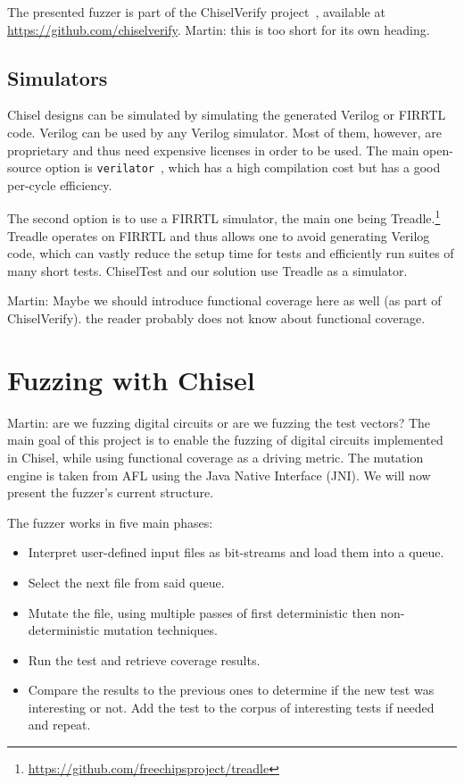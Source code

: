 \documentclass[conference]{IEEEtran}
\newcommand{\todo}[1]{{\color{olive} TODO: #1}}
\newcommand{\martin}[1]{{\color{blue} Martin: #1}}
\begin{document}
The presented fuzzer is part of the ChiselVerify project~\cite{verify:chisel:2020, dobis2021opensource}, available
at \url{https://github.com/chiselverify}.
\martin{this is too short for its own heading.}

\subsection{Simulators}

Chisel designs can be simulated by simulating the generated Verilog or FIRRTL code.
Verilog can be used by any Verilog simulator.
Most of them, however, are proprietary and thus need expensive licenses in order to be used. 
The main open-source option is \texttt{verilator}~\cite{verilator}, which has a high compilation cost but has a good per-cycle efficiency.

The second option is to use a FIRRTL simulator, the main one being Treadle.\footnote{\url{https://github.com/freechipsproject/treadle}}
Treadle operates on FIRRTL and thus allows one to avoid generating Verilog code, which can vastly reduce the setup time for tests and efficiently run suites of many short tests.
ChiselTest and our solution use Treadle as a simulator. 


\martin{Maybe we should introduce functional coverage here as well (as part of ChiselVerify). the reader probably does not know about functional coverage.}

\section{Fuzzing with Chisel}
\label{sec:fuzz}
\martin{are we fuzzing digital circuits or are we fuzzing the test vectors?}
The main goal of this project is to enable the fuzzing of digital circuits implemented in Chisel, while using functional coverage as a driving metric.
The mutation engine is taken from AFL using the Java Native Interface (JNI).
We will now present the fuzzer's current structure.

The fuzzer works in five main phases:  
\begin{itemize}
\item Interpret user-defined input files as bit-streams and load them into a queue.
\item Select the next file from said queue.
\item Mutate the file, using multiple passes of first deterministic then non-deterministic mutation techniques.  
\item Run the test and retrieve coverage results. 
\item Compare the results to the previous ones to determine if the new test was interesting or not. Add the test to the corpus of interesting tests if needed and repeat. 
\end{itemize}  
\end{document}
